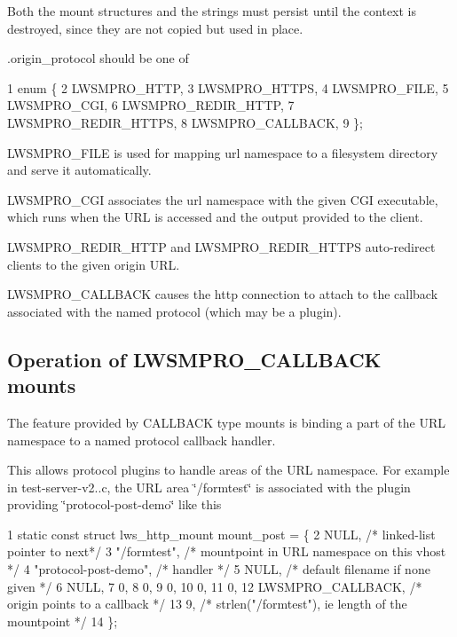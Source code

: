 Both the mount structures and the strings must persist until the context is destroyed, since they are not copied but used in place.

{\ttfamily .origin\+\_\+protocol} should be one of


\begin{DoxyCode}
1 enum \{
2         LWSMPRO\_HTTP,
3         LWSMPRO\_HTTPS,
4         LWSMPRO\_FILE,
5         LWSMPRO\_CGI,
6         LWSMPRO\_REDIR\_HTTP,
7         LWSMPRO\_REDIR\_HTTPS,
8         LWSMPRO\_CALLBACK,
9 \};
\end{DoxyCode}



\begin{DoxyItemize}
\item L\+W\+S\+M\+P\+R\+O\+\_\+\+F\+I\+LE is used for mapping url namespace to a filesystem directory and serve it automatically.
\item L\+W\+S\+M\+P\+R\+O\+\_\+\+C\+GI associates the url namespace with the given C\+GI executable, which runs when the U\+RL is accessed and the output provided to the client.
\item L\+W\+S\+M\+P\+R\+O\+\_\+\+R\+E\+D\+I\+R\+\_\+\+H\+T\+TP and L\+W\+S\+M\+P\+R\+O\+\_\+\+R\+E\+D\+I\+R\+\_\+\+H\+T\+T\+PS auto-\/redirect clients to the given origin U\+RL.
\item L\+W\+S\+M\+P\+R\+O\+\_\+\+C\+A\+L\+L\+B\+A\+CK causes the http connection to attach to the callback associated with the named protocol (which may be a plugin).
\end{DoxyItemize}

\subsection*{Operation of L\+W\+S\+M\+P\+R\+O\+\_\+\+C\+A\+L\+L\+B\+A\+CK mounts }

The feature provided by C\+A\+L\+L\+B\+A\+CK type mounts is binding a part of the U\+RL namespace to a named protocol callback handler.

This allows protocol plugins to handle areas of the U\+RL namespace. For example in test-\/server-\/v2..\+c, the U\+RL area \char`\"{}/formtest\char`\"{} is associated with the plugin providing \char`\"{}protocol-\/post-\/demo\char`\"{} like this


\begin{DoxyCode}
1 static const struct lws\_http\_mount mount\_post = \{
2         NULL,           /* linked-list pointer to next*/
3         "/formtest",            /* mountpoint in URL namespace on this vhost */
4         "protocol-post-demo",   /* handler */
5         NULL,   /* default filename if none given */
6         NULL,
7         0,
8         0,
9         0,
10         0,
11         0,
12         LWSMPRO\_CALLBACK,       /* origin points to a callback */
13         9,                      /* strlen("/formtest"), ie length of the mountpoint */
14 \};
\end{DoxyCode}


